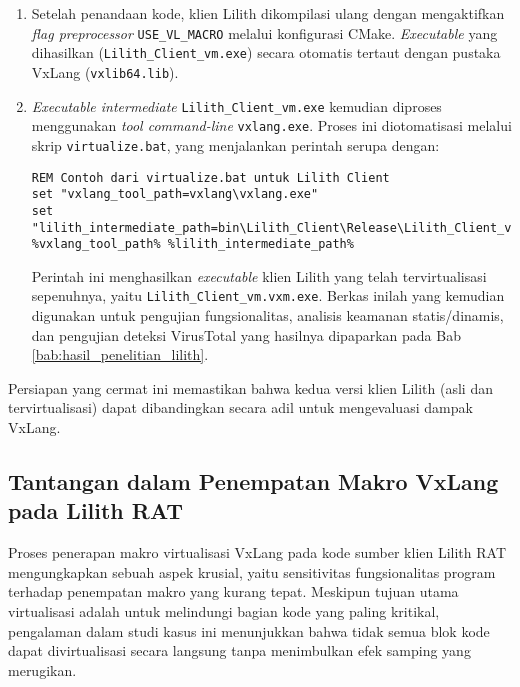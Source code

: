 \begin{enumerate}
    \item {}
    Setelah penandaan kode, klien Lilith dikompilasi ulang dengan mengaktifkan \textit{flag preprocessor} \texttt{USE\_VL\_MACRO} melalui konfigurasi CMake. \textit{Executable} yang dihasilkan (\texttt{Lilith\_Client\_vm.exe}) secara otomatis tertaut dengan pustaka VxLang (\texttt{vxlib64.lib}).

    \item {}
    \textit{Executable intermediate} \texttt{Lilith\_Client\_vm.exe} kemudian diproses menggunakan \textit{tool command-line} \texttt{vxlang.exe}. Proses ini diotomatisasi melalui skrip \texttt{virtualize.bat}, yang menjalankan perintah serupa dengan:
    \begin{listing}[H]
    \begin{verbatim}
REM Contoh dari virtualize.bat untuk Lilith Client
set "vxlang_tool_path=vxlang\vxlang.exe"
set "lilith_intermediate_path=bin\Lilith_Client\Release\Lilith_Client_vm.exe"
%vxlang_tool_path% %lilith_intermediate_path%
    \end{verbatim}
    \label{lst:virtualize_lilith_example_bab4_revised}
    \end{listing}
    Perintah ini menghasilkan \textit{executable} klien Lilith yang telah tervirtualisasi sepenuhnya, yaitu \texttt{Lilith\_Client\_vm.vxm.exe}. Berkas inilah yang kemudian digunakan untuk pengujian fungsionalitas, analisis keamanan statis/dinamis, dan pengujian deteksi VirusTotal yang hasilnya dipaparkan pada Bab \ref{bab:hasil_penelitian_lilith}.
\end{enumerate}

Persiapan yang cermat ini memastikan bahwa kedua versi klien Lilith (asli dan tervirtualisasi) dapat dibandingkan secara adil untuk mengevaluasi dampak VxLang.

\subsection{Tantangan dalam Penempatan Makro VxLang pada Lilith RAT}
\label{subsec:tantangan_makro_lilith}
Proses penerapan makro virtualisasi VxLang pada kode sumber klien Lilith RAT mengungkapkan sebuah aspek krusial, yaitu sensitivitas fungsionalitas program terhadap penempatan makro yang kurang tepat. Meskipun tujuan utama virtualisasi adalah untuk melindungi bagian kode yang paling kritikal, pengalaman dalam studi kasus ini menunjukkan bahwa tidak semua blok kode dapat divirtualisasi secara langsung tanpa menimbulkan efek samping yang merugikan.

